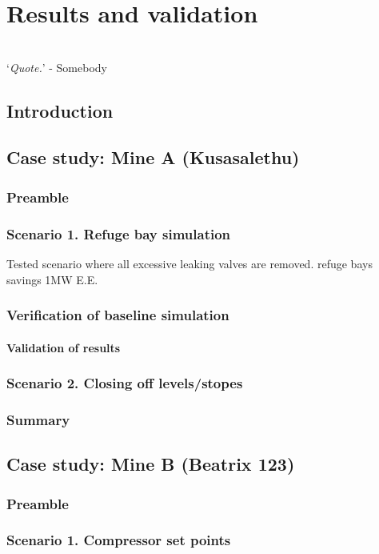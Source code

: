 \chapter{Results and validation}
\thispagestyle{empty}
\vspace{38em}
\hrulefill
\\
\enquote*{\textit{Quote.}} - Somebody\\
\newpage
\section{Introduction}
\section{Case study: Mine A \color{blue}(Kusasalethu)}
	\subsection{Preamble}
	\subsection{Scenario 1. Refuge bay simulation}
	Tested scenario where all excessive leaking valves are removed.
	refuge bays savings 1MW E.E.
	\subsection{Verification of baseline simulation}
	\subsubsection{Validation of results}
	\subsection{Scenario 2. Closing off levels/stopes}
	\subsection{Summary}
\section{Case study: Mine B \color{blue}(Beatrix 123)}
	\subsection{Preamble}
	\subsection{Scenario 1. Compressor set points}
